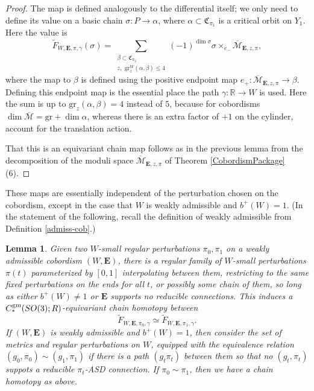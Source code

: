 \documentclass[10pt,a4paper]{amsart}
\newtheorem{lemma}[theorem]{Lemma}
\theoremstyle{definition}
\theoremstyle{remark}
\numberwithin{figure}{qchap}
\begin{document}
\begin{proof}
The map is defined analogously to the differential itself; we only need to define its value on a basic chain $\sigma: P \to \alpha$, where $\alpha \subset \mathfrak C_{\pi_1}$ is a critical orbit on $Y_1$. Here the value is $$\widetilde F_{W,\mathbf{E},\pi,\gamma}\left(\sigma\right) = \sum_{\substack{\beta \subset \mathfrak C_{\pi_2}\\ z, \text{ gr}^W_z(\alpha, \beta) \leq 4}} (-1)^{\dim \sigma} \sigma \times_{e_-} \overline{\mathcal M}_{\mathbf{E}, z, \pi},$$ where the map to $\beta$ is defined using the positive endpoint map $e_+: \overline{\mathcal M}_{\mathbf{E}, z, \pi} \to \beta$. Defining this endpoint map is the essential place the path $\gamma: \mathbb R \to W$ is used. Here the sum is up to $\text{gr}_z(\alpha, \beta) = 4$ instead of $5$, because for cobordisms $\dim \overline{\mathcal M} = \text{gr} + \dim \alpha$, whereas there is an extra factor of $+1$ on the cylinder, account for the translation action.

That this is an equivariant chain map follows as in the previous lemma from the decomposition of the moduli space $\overline{\mathcal M}_{\mathbf{E}, z, \pi}$ of Theorem \ref{CobordismPackage} (6).
\end{proof}

These maps are essentially independent of the perturbation chosen on the cobordism, except in the case that $W$ is weakly admissible and $b^+(W) = 1$. (In the statement of the following, recall the definition of weakly admissible from Definition \ref{admiss-cob}.)

\begin{lemma}\label{invariance}Given two $W$-small regular perturbations $\pi_0, \pi_1$ on a weakly admissible cobordism $(W, \mathbf{E})$, there is a regular family of $W$-small perturbations $\pi(t)$ parameterized by $[0,1]$ interpolating between them, restricting to the same fixed perturbations on the ends for all $t$, or possibly some chain of them, so long as either $b^+(W) \neq 1$ or $\mathbf{E}$ supports no reducible connections. This induces a $C_*^{\textup{gm}}(SO(3);R)$-equivariant chain homotopy between
$$\widetilde F_{W,\mathbf{E}, \pi_0, \gamma} \simeq \widetilde F_{W,\mathbf{E}, \pi_1, \gamma}.$$
If $(W,\mathbf{E})$ is weakly admissible and $b^+(W) = 1$, then consider the set of metrics and regular perturbations on $W$, equipped with the equivalence relation $(g_0, \pi_0) \sim (g_1, \pi_1)$ if there is a path $(g_t\pi_t)$ between them so that no $(g_t,\pi_t)$ suppots a reducible $\pi_t$-ASD connection. If $\pi_0 \sim \pi_1$, then we have a chain homotopy as above.
\end{lemma}
\end{document}
